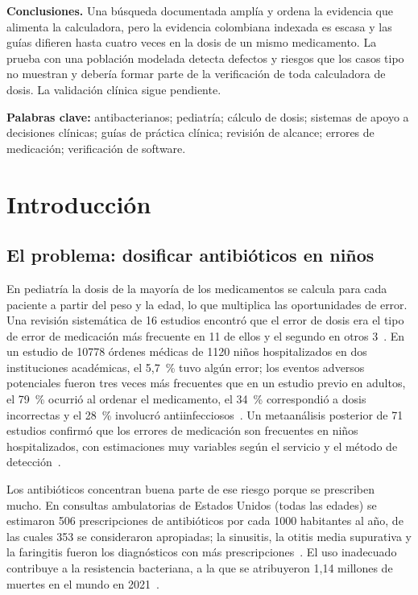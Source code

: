 \documentclass[11pt,a4paper]{article}
\begin{document}
\noindent\textbf{Conclusiones.} Una búsqueda documentada amplía y ordena la evidencia que alimenta la calculadora, pero la evidencia colombiana indexada es escasa y las guías difieren hasta cuatro veces en la dosis de un mismo medicamento. La prueba con una población modelada detecta defectos y riesgos que los casos tipo no muestran y debería formar parte de la verificación de toda calculadora de dosis. La validación clínica sigue pendiente.

\noindent\textbf{Palabras clave:} antibacterianos; pediatría; cálculo de dosis; sistemas de apoyo a decisiones clínicas; guías de práctica clínica; revisión de alcance; errores de medicación; verificación de software.

\newpage
\tableofcontents
\newpage

\section{Introducción}

\subsection{El problema: dosificar antibióticos en niños}

En pediatría la dosis de la mayoría de los medicamentos se calcula para cada paciente a partir del peso y la edad, lo que multiplica las oportunidades de error. Una revisión sistemática de 16 estudios encontró que el error de dosis era el tipo de error de medicación más frecuente en 11 de ellos y el segundo en otros 3~\citep{wong2004}. En un estudio de \num{10778} órdenes médicas de \num{1120} niños hospitalizados en dos instituciones académicas, el 5,7~\% tuvo algún error; los eventos adversos potenciales fueron tres veces más frecuentes que en un estudio previo en adultos, el 79~\% ocurrió al ordenar el medicamento, el 34~\% correspondió a dosis incorrectas y el 28~\% involucró antiinfecciosos~\citep{kaushal2001}. Un metaanálisis posterior de 71 estudios confirmó que los errores de medicación son frecuentes en niños hospitalizados, con estimaciones muy variables según el servicio y el método de detección~\citep{gates2019}.

Los antibióticos concentran buena parte de ese riesgo porque se prescriben mucho. En consultas ambulatorias de Estados Unidos (todas las edades) se estimaron 506 prescripciones de antibióticos por cada \num{1000} habitantes al año, de las cuales 353 se consideraron apropiadas; la sinusitis, la otitis media supurativa y la faringitis fueron los diagnósticos con más prescripciones~\citep{flemingdutra2016}. El uso inadecuado contribuye a la resistencia bacteriana, a la que se atribuyeron 1,14 millones de muertes en el mundo en 2021~\citep{gbdamr2024}.
\end{document}
